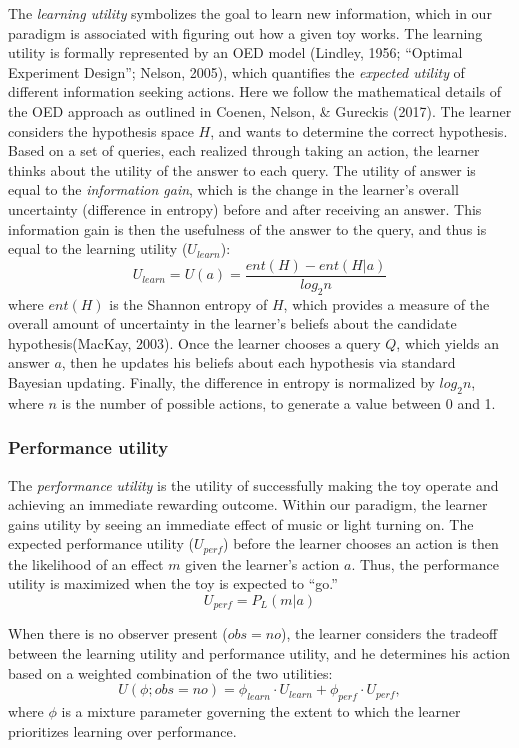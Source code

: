 \documentclass[10pt, letterpaper]{article}
\begin{document}
The \emph{learning utility} symbolizes the goal to learn new
information, which in our paradigm is associated with figuring out how a
given toy works. The learning utility is formally represented by an OED
model (Lindley, 1956; ``Optimal Experiment Design''; Nelson, 2005),
which quantifies the \emph{expected utility} of different information
seeking actions. Here we follow the mathematical details of the OED
approach as outlined in Coenen, Nelson, \& Gureckis (2017). The learner
considers the hypothesis space \(H\), and wants to determine the correct
hypothesis. Based on a set of queries, each realized through taking an
action, the learner thinks about the utility of the answer to each
query. The utility of answer is equal to the \emph{information gain},
which is the change in the learner's overall uncertainty (difference in
entropy) before and after receiving an answer. This information gain is
then the usefulness of the answer to the query, and thus is equal to the
learning utility (\(U_{learn}\)):
\[ U_{learn} = U(a) = \frac{ent(H) - ent(H|a)}{log_2n}\] \noindent
where \(ent(H)\) is the Shannon entropy of \(H\), which provides a
measure of the overall amount of uncertainty in the learner's beliefs
about the candidate hypothesis(MacKay, 2003). Once the learner chooses a
query \(Q\), which yields an answer \(a\), then he updates his beliefs
about each hypothesis via standard Bayesian updating. Finally, the
difference in entropy is normalized by \(log_2 n\), where \(n\) is the
number of possible actions, to generate a value between 0 and 1.

\subsubsection{Performance utility}\label{performance-utility}

The \emph{performance utility} is the utility of successfully making the
toy operate and achieving an immediate rewarding outcome. Within our
paradigm, the learner gains utility by seeing an immediate effect of
music or light turning on. The expected performance utility
(\(U_{perf}\)) before the learner chooses an action is then the
likelihood of an effect \(m\) given the learner's action \(a\). Thus,
the performance utility is maximized when the toy is expected to ``go.''
\[ U_{perf} = P_L(m | a) \] \noindent

When there is no observer present (\(obs = no\)), the learner considers
the tradeoff between the learning utility and performance utility, and
he determines his action based on a weighted combination of the two
utilities:
\[ U(\phi; obs = no) = \phi_{learn} \cdot U_{learn} + \phi_{perf} \cdot U_{perf} ,\]
\noindent
where \(\phi\) is a mixture parameter governing the extent to which the
learner prioritizes learning over performance.
\end{document}
